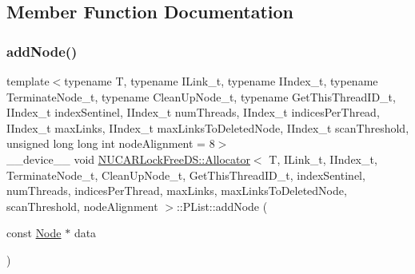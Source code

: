 \subsection{Member Function Documentation}
\mbox{\label{class_n_u_c_a_r_lock_free_d_s_1_1_allocator_1_1_p_list_a62645ee0694885ea2d460db3c34c84ae}} 
\subsubsection{\texorpdfstring{add\+Node()}{addNode()}}
{\footnotesize\ttfamily template$<$typename T, typename I\+Link\+\_\+t, typename I\+Index\+\_\+t, typename Terminate\+Node\+\_\+t, typename Clean\+Up\+Node\+\_\+t, typename Get\+This\+Thread\+I\+D\+\_\+t, I\+Index\+\_\+t index\+Sentinel, I\+Index\+\_\+t num\+Threads, I\+Index\+\_\+t indices\+Per\+Thread, I\+Index\+\_\+t max\+Links, I\+Index\+\_\+t max\+Links\+To\+Deleted\+Node, I\+Index\+\_\+t scan\+Threshold, unsigned long long int node\+Alignment = 8$>$ \\
\+\_\+\+\_\+device\+\_\+\+\_\+ void \mbox{\hyperlink{class_n_u_c_a_r_lock_free_d_s_1_1_allocator}{N\+U\+C\+A\+R\+Lock\+Free\+D\+S\+::\+Allocator}}$<$ T, I\+Link\+\_\+t, I\+Index\+\_\+t, Terminate\+Node\+\_\+t, Clean\+Up\+Node\+\_\+t, Get\+This\+Thread\+I\+D\+\_\+t, index\+Sentinel, num\+Threads, indices\+Per\+Thread, max\+Links, max\+Links\+To\+Deleted\+Node, scan\+Threshold, node\+Alignment $>$\+::P\+List\+::add\+Node (\begin{DoxyParamCaption}\item[{const \mbox{\hyperlink{class_n_u_c_a_r_lock_free_d_s_1_1_allocator_1_1_node}{Node}} $\ast$}]{data }\end{DoxyParamCaption})\hspace{0.3cm}{\ttfamily [inline]}}

\mbox{\label{class_n_u_c_a_r_lock_free_d_s_1_1_allocator_1_1_p_list_a05e00c2ca0f24298e7db21563368a416}} 
